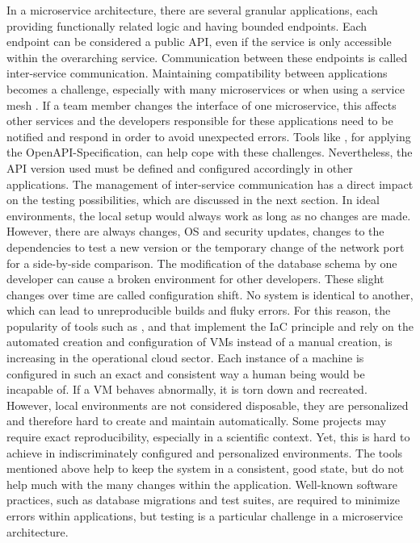         In a microservice architecture, there are several granular applications, each providing functionally related logic and having bounded endpoints. Each endpoint can be considered a public \ac{API}, even if the service is only accessible within the overarching service. Communication between these endpoints is called inter-service communication. Maintaining compatibility between applications becomes a challenge, especially with many microservices or when using a service mesh \cite{micro}. If a team member changes the interface of one microservice, this affects other services and the developers responsible for these applications need to be notified and respond in order to avoid unexpected errors. Tools like , for applying the OpenAPI-Specification, can help cope with these challenges. Nevertheless, the \ac{API} version used must be defined and configured accordingly in other applications. The management of inter-service communication has a direct impact on the testing possibilities, which are discussed in the next section.\newline
        In ideal environments, the local setup would always work as long as no changes are made. However, there are always changes, \ac{OS} and security updates, changes to the dependencies to test a new version or the temporary change of the network port for a side-by-side comparison. The modification of the database schema by one developer can cause a broken environment for other developers. These slight changes over time are called configuration shift. No system is identical to another, which can lead to unreproducible builds and fluky errors. For this reason, the popularity of tools such as ,  and  that implement the \ac{IaC} principle and rely on the automated creation and configuration of \ac{VM}s instead of a manual creation, is increasing in the operational cloud sector. Each instance of a machine is configured in such an exact and consistent way a human being would be incapable of. If a \ac{VM} behaves abnormally, it is torn down and recreated. However, local environments are not considered disposable, they are personalized and therefore hard to create and maintain automatically. Some projects may require exact reproducibility, especially in a scientific context. Yet, this is hard to achieve in indiscriminately configured and personalized environments.\newline
        The tools mentioned above help to keep the system in a consistent, good state, but do not help much with the many changes within the application. Well-known software practices, such as database migrations and test suites, are required to minimize errors within applications, but testing is a particular challenge in a microservice architecture.

